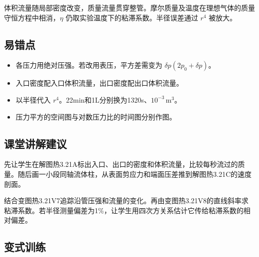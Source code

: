\documentclass[UTF8,fontset=fandol,a4paper,11pt]{ctexart}
\begin{document}
体积流量随局部密度改变，质量流量贯穿整管。摩尔质量及温度在理想气体的质量守恒方程中相消，$\eta$ 仍取实验温度下的粘滞系数。半径误差通过 $r^4$ 被放大。



\subsection*{易错点}

\begin{itemize}
\item 各压力用绝对压强。若改用表压，平方差需变为 $\delta p(2p_0+\delta p)$。
\item 入口密度配入口体积流量，出口密度配出口体积流量。
\item 以半径代入 $r^4$。22min和1L分别换为1320s、$10^{-3}\,\mathrm{m^3}$。
\item 压力平方的空间图与对数压力比的时间图分别作图。
\end{itemize}



\subsection*{课堂讲解建议}

先让学生在解图热3.21A标出入口、出口的密度和体积流量，比较每秒流过的质量。随后画一小段同轴流体柱，从表面剪应力和端面压差推到解图热3.21C的速度剖面。

结合变图热3.21V7追踪沿管压强和流量的变化。再由变图热3.21V8的直线斜率求粘滞系数。若半径测量偏差为1\%，让学生用四次方关系估计它传给粘滞系数的相对偏差。



\subsection*{变式训练}
\end{document}
